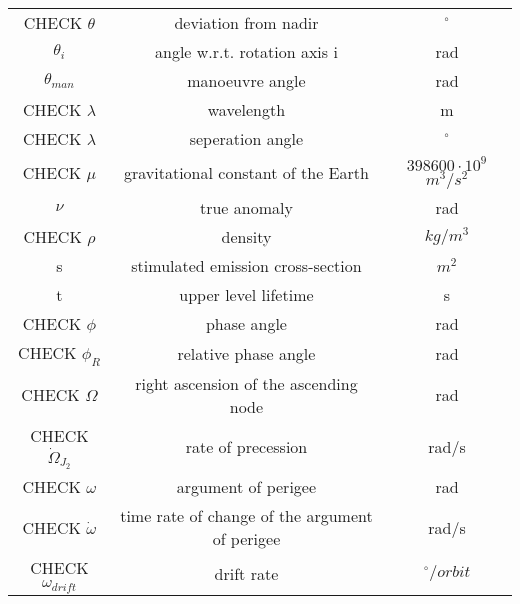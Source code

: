 \begin{center}
\begin{longtable}{c|c|c}
CHECK $\theta$                            & deviation from nadir                             &  $^\circ$ \\

$\theta _i$ 												& angle w.r.t. rotation axis i 								& rad \\

$\theta _{man}$ 										& manoeuvre angle 														& rad \\

CHECK $\lambda$ 													& wavelength																	& m \\

CHECK $\lambda$ 													& seperation angle																	& $^\circ$ \\ 

CHECK $\mu$														 		& gravitational constant of the Earth 				& $398600\cdot 10^9$ $m^3/s^2$ \\

$\nu$ 															& true anomaly 																& rad \\

CHECK $\rho$ 															& density 																		& $kg/m^3$ \\

s 																	& stimulated emission cross-section 					& $m^2$ \\

t 																	& upper level lifetime 												& s \\

CHECK $\phi$ 															& phase angle 																& rad \\
	
CHECK $\phi _R$														& relative phase angle 												& rad \\
     
CHECK $\Omega$ 														& right ascension of the ascending node 			& rad \\

CHECK $\dot \Omega _{J_2 }$ 							& rate of precession 													& rad/s \\

CHECK $\omega$ 														& argument of perigee													& rad \\

CHECK $\dot \omega$ 											& time rate of change of the argument of perigee & rad/s\\

CHECK $\omega_{drift}$                    & drift rate                                  & $^\circ/orbit$ \\
 
\end{longtable}
\end{center}